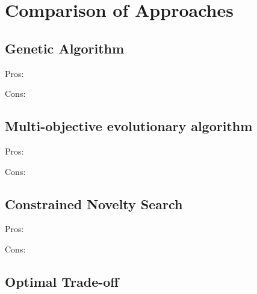 \section{Comparison of Approaches}
\label{discussion_comparison}
\subsection{Genetic Algorithm}
\label{discussion_comparison_geneticalgorithm}

Pros:
\begin{my_itemize}
\item
\item
\end{my_itemize}
Cons:
\begin{my_itemize}
\item
\item
\end{my_itemize}

\subsection{Multi-objective evolutionary algorithm}
\label{discussion_comparison_moea}
Pros:
\begin{my_itemize}
\item
\item
\end{my_itemize}
Cons:
\begin{my_itemize}
\item
\item
\end{my_itemize}

\subsection{Constrained Novelty Search}
\label{discussion_comparison_constrainednoveltysearch}
Pros:
\begin{my_itemize}
\item
\item
\end{my_itemize}
Cons:
\begin{my_itemize}
\item
\item
\end{my_itemize}

\subsection{Optimal Trade-off}

